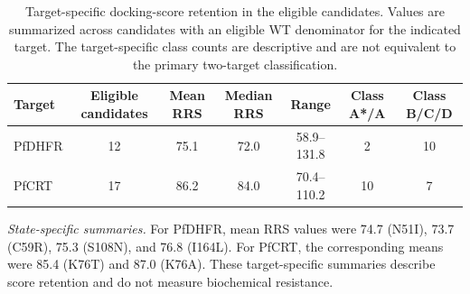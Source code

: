 \begin{table}[htbp]
\centering
\scriptsize
\caption{Target-specific docking-score retention in the eligible candidates. Values are summarized across candidates with an eligible WT denominator for the indicated target. The target-specific class counts are descriptive and are not equivalent to the primary two-target classification.}
\label{tab:s12_rrs_by_target}
\begin{tabular}{l c c c c c c}
\toprule
Target & Eligible candidates & Mean RRS & Median RRS & Range & Class A*/A & Class B/C/D \\
\midrule
PfDHFR & 12 & 75.1 & 72.0 & 58.9--131.8 & 2 & 10 \\
PfCRT & 17 & 86.2 & 84.0 & 70.4--110.2 & 10 & 7 \\
\bottomrule
\end{tabular}
\end{table}

\noindent\textit{State-specific summaries.} For PfDHFR, mean RRS values were 74.7 (N51I), 73.7 (C59R), 75.3 (S108N), and 76.8 (I164L). For PfCRT, the corresponding means were 85.4 (K76T) and 87.0 (K76A). These target-specific summaries describe score retention and do not measure biochemical resistance.
